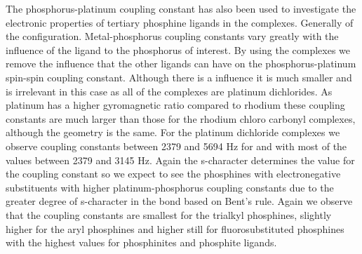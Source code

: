 The phosphorus-platinum coupling constant has also been used to investigate the electronic properties of tertiary phosphine ligands in the \ce{[PtCl2L2]} complexes.  Generally of the \trans{} configuration.  Metal-phosphorus coupling constants vary greatly with the \trans{} influence of the ligand \trans{} to the phosphorus of interest.  By using the \trans{} complexes we remove the influence that the other ligands can have on the phosphorus-platinum spin-spin coupling constant.  Although there is a \cis{} influence it is much smaller and is irrelevant in this case as all of the complexes are platinum dichlorides.  As platinum has a higher gyromagnetic ratio  compared to rhodium these coupling constants are much larger than those for the rhodium chloro carbonyl complexes, although the geometry is the same.  For the platinum dichloride complexes we observe coupling constants between 2379 and 5694 Hz for  and  with most of the values between 2379 and 3145 Hz.  Again the s-character determines the value for the coupling constant so we expect to see the phosphines with electronegative substituents with higher platinum-phosphorus coupling constants due to the greater degree of s-character in the bond based on Bent's rule.  Again we observe that the coupling constants are smallest for the trialkyl phosphines, slightly higher for the aryl phosphines and higher still for fluorosubstituted phosphines with the highest values for phosphinites and phosphite ligands.  

